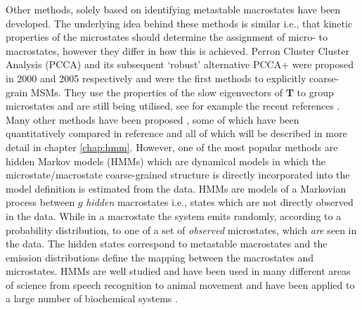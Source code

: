 Other methods, solely based on identifying metastable macrostates have been developed.  The underlying idea behind these methods is similar i.e., that kinetic properties of the microstates should determine the assignment of micro- to macrostates, however they differ in how this is achieved. Perron Cluster Cluster Analysis (PCCA)  \cite{deuflhardIdentificationAlmostInvariant2000a} and its subsequent `robust' alternative PCCA+ \cite{deuflhardRobustPerronCluster2005b} were proposed in 2000 and 2005 respectively and were the first methods to explicitly coarse-grain MSMs. They use the properties of the slow eigenvectors of $\mathbf{T}$ to group microstates and are still being utilised, see for example the recent references \cite{LoopMotionTriosephosphate, plattnerProteinConformationalPlasticity2015, islamExploringDynamicsPropeller2017}. Many other methods have been proposed \cite{yaoHierarchicalNystromMethods2013a, bowmanImprovedCoarsegrainingMarkov2012a, jainIdentifyingMetastableStates2012a, orioliDimensionalReductionMarkov2016c, husicMinimumVarianceClustering2018, wuProjectedMetastableMarkov2015}, some of which have been quantitatively compared in reference \cite{bowmanQuantitativeComparisonAlternative2013} and all of which will be described in more detail in chapter \ref{chap:hmm}.  However, one of the most popular methods are hidden Markov models (HMMs) \cite{noeProjectedHiddenMarkov2013a} which are dynamical models in which the microstate/macrostate coarse-grained structure is directly incorporated into the model definition is estimated from the data. HMMs are models of a Markovian process between $g$ \emph{hidden} macrostates i.e., states which are not directly observed in the data. While in a macrostate the system emits randomly, according to a probability distribution, to one of a set of \emph{observed} microstates, which \emph{are} seen in the data. The hidden states correspond to metastable macrostates and the emission distributions  define the mapping between the macrostates and microstates. HMMs are well studied  \cite{welch2003hidden, rabinerTutorialHiddenMarkov1989} and have been used in many different areas of science from speech recognition \cite{rabinerTutorialHiddenMarkov1989} to animal movement \cite{pohleSelectingNumberStates2017} and have been applied to a large number of biochemical systems \cite{mondalAtomicResolutionMechanism2018a, plattnerCompleteProteinProtein2017, panConformationalHeterogeneityMichaelis2016, juarez-jimenezDynamicDesignManipulation2020, wangDynamicalBehaviorVLactamases2019,FastFoldingPathwaysThrombinBinding2018,remingtonFluorescenceQuenching2aminopurinelabeled2019,curado-carballadaHiddenConformationsAspergillus2019,furiniIontriggeredSelectivityBacterial2018,yangMappingPathwayDynamics2018,ahalawatMappingSubstrateRecognition2018,olaposiMembraneBoundTranscriptionFactor2019, xiaoNaBindingModes2019, hansonWhatMakesKinase2019}.

